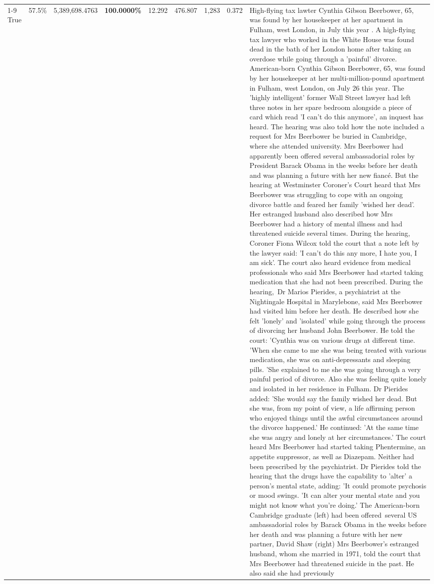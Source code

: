 \begin{table}[H]
\begin{tabular}{lllrlllll}
\cline{1-9}
True & 57.5\% & 5,389,698.4763 & \bfseries \color{red} 100.0000\% & 12.292 & 476.807 & 1,283 & 0.372 & High-flying tax lawter Cynthia Gibson Beerbower, 65, was found by her housekeeper at her apartment in Fulham, west London, in July this year . A high-flying tax lawyer who worked in the White House was found dead in the bath of her London home after taking an overdose while going through a 'painful' divorce. American-born Cynthia Gibson Beerbower, 65, was found by her housekeeper at her multi-million-pound apartment in Fulham, west London, on July 26 this year. The 'highly intelligent' former Wall Street lawyer had left three notes in her spare bedroom alongside a piece of card which read 'I can't do this anymore', an inquest has heard. The hearing was also told how the note included a request for Mrs Beerbower be buried in Cambridge, where she attended university. Mrs Beerbower had apparently been offered several ambassadorial roles by President Barack Obama in the weeks before her death and was planning a future with her new fiancé. But the hearing at Westminster Coroner's Court heard that Mrs Beerbower was struggling to cope with an ongoing divorce battle and feared her family 'wished her dead'. Her estranged husband also described how Mrs Beerbower had a history of mental illness and had threatened suicide several times. During the hearing, Coroner Fiona Wilcox told the court that a note left by the lawyer said: 'I can't do this any more, I hate you, I am sick'. The court also heard evidence from medical professionals who said Mrs Beerbower had started taking medication that she had not been prescribed. During the hearing, Dr Marios Pierides, a psychiatrist at the Nightingale Hospital in Marylebone, said Mrs Beerbower had visited him before her death. He described how she felt 'lonely' and 'isolated' while going through the process of divorcing her husband John Beerbower. He told the court: 'Cynthia was on various drugs at different time. 'When she came to me she was being treated with various medication, she was on anti-depressants and sleeping pills. 'She explained to me she was going through a very painful period of divorce. Also she was feeling quite lonely and isolated in her residence in Fulham. Dr Pierides added: 'She would say the family wished her dead. But she was, from my point of view, a life affirming person who enjoyed things until the awful circumstances around the divorce happened.' He continued: 'At the same time she was angry and lonely at her circumstances.' The court heard Mrs Beerbower had started taking Phentermine, an appetite suppressor, as well as Diazepam. Neither had been prescribed by the psychiatrist. Dr Pierides told the hearing that the drugs have the capability to 'alter' a person's mental state, adding: 'It could promote psychosis or mood swings. 'It can alter your mental state and you might not know what you're doing.' The American-born Cambridge graduate (left) had been offered several US ambassadorial roles by Barack Obama in the weeks before her death and was planning a future with her new partner, David Shaw (right) Mrs Beerbower's estranged husband, whom she married in 1971, told the court that Mrs Beerbower had threatened suicide in the past. He also said she had previously 
\end{tabular}
\end{table}
